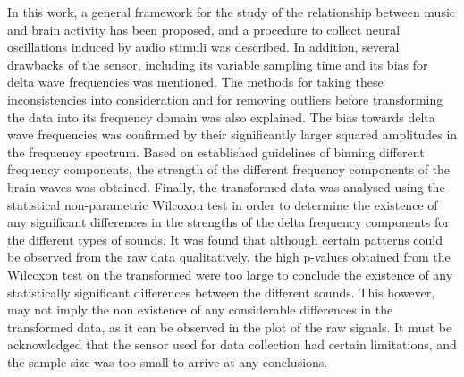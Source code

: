 \documentclass[twocolumn,superscriptaddress]{revtex4-1}
\theoremstyle{definition}
\theoremstyle{remark}
\begin{document}
In this work, a general framework for the study of the relationship between music and brain activity has been proposed, and a procedure to collect neural oscillations induced by audio stimuli was described. In addition, several drawbacks of the sensor, including its variable sampling time and its bias for delta wave frequencies was mentioned. The methods for taking these inconsistencies into consideration and for removing outliers before transforming the data into its frequency domain was also explained. The bias towards delta wave frequencies was confirmed by their significantly larger squared amplitudes in the frequency spectrum. Based on established guidelines of binning different frequency components, the strength of the different frequency components of the brain waves was obtained. Finally, the transformed data was analysed using the statistical non-parametric Wilcoxon test in order to determine the existence of any significant differences in the strengths of the delta frequency components for the different types of sounds. It was found that although certain patterns could be observed from the raw data qualitatively, the high p-values obtained from the Wilcoxon test on the transformed were too large to conclude the existence of any statistically significant differences between the different sounds.   
This however, may not imply the non existence of any considerable differences in the transformed data, as it can be observed in the plot of the raw signals. It must be acknowledged that the sensor used for data collection had certain limitations, and the sample size was too small to arrive at any conclusions. \\
\end{document}
